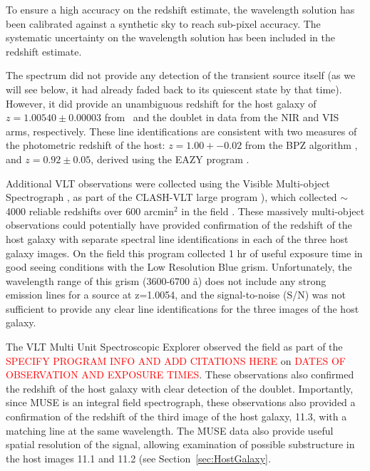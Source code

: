 To ensure a high accuracy on the redshift estimate, the wavelength solution
has been calibrated against a synthetic sky to reach sub-pixel accuracy. The
systematic uncertainty on the wavelength solution has been included in the
redshift estimate.

The spectrum did not provide any detection of the transient
source itself (as we will see below, it had already faded back to its
quiescent state by that time).  However, it did provide an unambiguous
redshift for the host galaxy of $z=1.00540\pm0.00003$ from \Ha\ and the
 doublet in data from the NIR and VIS arms,
respectively.  These line identifications are consistent with two
measures of the photometric redshift of the host: $z=1.00+-0.02$ from
the BPZ algorithm \citep{Benitez:2000}, and $z=0.92\pm0.05$, derived
using the EAZY program \citep{Brammer:2008}.

Additional VLT observations were collected using the Visible Multi-object
Spectrograph \citep[VIMOS][]{LeFevre:2003}, as part of the CLASH-VLT large
program \citep[Program 186.A-0.798; P.I.: P. Rosati;][]{Rosati:2014}),
which collected $\sim$4000 reliable redshifts over 600 arcmin$^2$ in
the  field \citep{Grillo:2015a,Balestra:2015}.  These
massively multi-object observations could potentially have provided
confirmation of the redshift of the \spock host galaxy with separate
spectral line identifications in each of the three host galaxy images.
On the  field this program collected 1 hr of useful exposure
time in good seeing conditions with the Low Resolution Blue grism.
Unfortunately, the wavelength range of this grism (3600-6700 \aa) does
not include any strong emission lines for a source at z=1.0054, and
the signal-to-noise (S/N) was not sufficient to provide any clear line
identifications for the three images of the \spock host galaxy.

The VLT Multi Unit Spectroscopic Explorer
\citep[MUSE;][]{Henault:2003,Bacon:2012} observed the  field
as part of the \textcolor{red}{SPECIFY PROGRAM INFO AND ADD CITATIONS
  HERE} on \textcolor{red}{DATES OF OBSERVATION AND EXPOSURE TIMES}.
These observations also confirmed the redshift of the host galaxy with
clear detection of the  doublet.  Importantly, since
MUSE is an integral field spectrograph, these observations also
provided a confirmation of the redshift of the third image of the host
galaxy, 11.3, with a matching  line at the same
wavelength. The MUSE data also provide useful spatial resolution of
the  signal, allowing examination of possible
substructure in the host images 11.1 and 11.2 (see
Section~\ref{sec:HostGalaxy}. 


